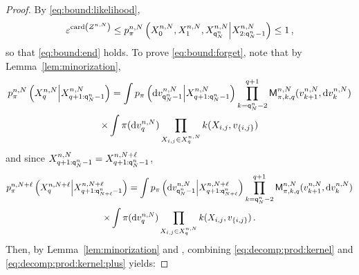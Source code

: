 \begin{proof}
By \eqref{eq:bound:likelihood},
\[
\varepsilon^{\mathrm{card}\left(Z^{n,N}\right)}\le p_{\pi}^{n,N}\left(X_{0}^{n,N},X_{1}^{n,N},X_{{\mathsf{q}}^{n}_{N}}^{n,N}\middle|X_{2:{\mathsf{q}}^{n}_{N}-1}^{n,N}\right)  \le 1\,,
\]
so that \eqref{eq:bound:end} holds. To prove \eqref{eq:bound:forget}, note that by Lemma~\ref{lem:minorization},  
\begin{multline}
\label{eq:decomp:prod:kernel}
p_{\pi}^{n,N}\left(X^{n,N}_{q}\middle|X^{n,N}_{q+1:{\mathsf{q}}^{n}_{N}-1}\right) = \int p_{\pi}\left(\mathrm{d} v_{{\mathsf{q}}^{n}_{N}-1}^{n,N}\middle | X^{n,N}_{q+1:{\mathsf{q}}^{n}_{N}-1}\right) \prod_{k ={\mathsf{q}}^{n}_{N}-2}^{q+1}\mathsf{M}^{n,N}_{\pi,k,q}(v_{k+1}^{n,N},\mathrm{d} v_k^{n,N})\\
\times\int \pi(\mathrm{d} v_q^{n,N})\prod_{X_{i,j}\in X_{q}^{n,N}}k(X_{i,j},v_{\{i,j\}})
\end{multline}
and since $X^{n,N}_{q+1:{\mathsf{q}}^{n}_{N}-1}=X^{n,N+\ell}_{q+1:{\mathsf{q}}^{n}_{N}-1}$,
\begin{multline}
\label{eq:decomp:prod:kernel:plus}
p_{\pi}^{n,N+\ell}\left(X^{n,N+\ell}_{q}\middle|X^{n,N+\ell}_{q+1:{\mathsf{q}}^{n}_{N+\ell}-1}\right) = \int p_{\pi}\left(\mathrm{d} v_{{\mathsf{q}}^{n}_{N}-1}^{n,N}\middle | X^{n,N+\ell}_{q+1:{\mathsf{q}}^{n}_{N+\ell}}\right) \prod_{k ={\mathsf{q}}^{n}_{N}-2}^{q+1}\mathsf{M}^{n,N}_{\pi,k,q}(v_{k+1}^{n,N},\mathrm{d} v_k^{n,N})\\
\times\int \pi(\mathrm{d} v_q^{n,N})\prod_{X_{i,j}\in X_{q}^{n,N}}k(X_{i,j},v_{\{i,j\}})\,.
\end{multline}
Then, by Lemma~\ref{lem:minorization} and \cite{lindvall:1992}, combining \eqref{eq:decomp:prod:kernel} and \eqref{eq:decomp:prod:kernel:plus} yields:

\end{proof}
